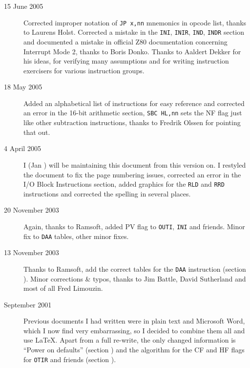 \begin{description}
	\item[15 June 2005]
	Corrected improper notation of {\tt JP x,nn} mnemonics in opcode list, thanks to Laurens Holst. Corrected a mistake in the {\tt INI}, {\tt INIR}, {\tt IND}, {\tt INDR} section and documented a mistake in official Z80 documentation concerning Interrupt Mode 2, thanks to Boris Donko. Thanks to Aaldert Dekker for his ideas, for verifying many assumptions and for writing instruction exercisers for various instruction groups.

	\item[18 May 2005]
	Added an alphabetical list of instructions for easy reference and corrected an error in the 16-bit arithmetic section, {\tt SBC HL,nn} sets the NF flag just like other subtraction instructions, thanks to Fredrik Olssen for pointing that out.

	\item[4 April 2005]
	I (Jan ) will be maintaining this document from this version on. I restyled the document to fix the page numbering issues, corrected an error in the I/O Block Instructions section, added graphics for the {\tt RLD} and {\tt RRD} instructions and corrected the spelling in several places.

	\item[20 November 2003]
	Again, thanks to Ramsoft, added PV flag to {\tt OUTI}, {\tt INI} and friends. Minor fix to {\tt DAA} tables, other minor fixes.

	\item[13 November 2003]
	Thanks to Ramsoft, add the correct tables for the {\tt DAA} instruction (section ). Minor corrections \& typos, thanks to Jim Battle, David Sutherland and most of all Fred Limouzin.

	\item[September 2001]
	Previous documents I had written were in plain text and Microsoft Word, which I now find very embarrassing, so I decided to combine them all and use {\LaTeX}. Apart from a full re-write, the only changed information is ``Power on defaults'' (section ) and the algorithm for the CF and HF flags for {\tt OTIR} and friends (section ).

\end{description}


\pagebreak
\IntentionallyEmpty
\pagebreak
